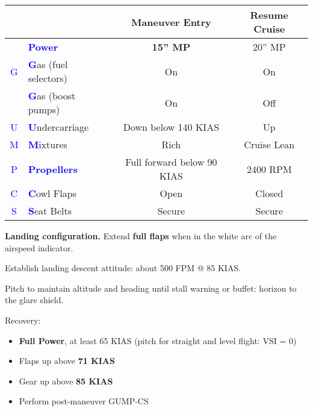 {\begin{table}[H]
\centering
\begin{tabular}{|c|l|c|c|}
\hline
                    &                                                 & \textbf{Maneuver Entry} & \textbf{Resume Cruise} \\ \hline
                    & \textcolor{blue}{\textbf{Power}}                & \textbf{15'' MP}        & 20'' MP                \\ \hline
\textcolor{blue}{G} & \textcolor{blue}{\textbf{G}}as (fuel selectors) & On                      & On                     \\
                    & \textcolor{blue}{\textbf{G}}as (boost pumps)    & On                      & Off                    \\ \hline
\textcolor{blue}{U} & \textcolor{blue}{\textbf{U}}ndercarriage        & Down below 140 KIAS     & Up                     \\ \hline
\textcolor{blue}{M} & \textcolor{blue}{\textbf{M}}ixtures             & Rich                    & Cruise Lean            \\ \hline
\textcolor{blue}{P} & \textcolor{blue}{\textbf{Propellers}}           & Full forward below 90 KIAS & 2400 RPM            \\ \hline
\textcolor{blue}{C} & \textcolor{blue}{\textbf{C}}owl Flaps           & Open                    & Closed                 \\ \hline
\textcolor{blue}{S} & \textcolor{blue}{\textbf{S}}eat Belts           & Secure                  & Secure                 \\ \hline
\end{tabular}
\end{table}

\textbf{Landing configuration.} Extend \textbf{full flaps} when in the white arc of the airspeed indicator.

Establish landing descent attitude: about 500 FPM @ 85 KIAS.

Pitch to maintain altitude and heading until stall warning or buffet: horizon to the glare shield.

Recovery:
\begin{itemize}[label={}]
\item \textbf{Full Power}, at least 65 KIAS (pitch for straight and level flight: VSI = 0)
\item Flaps up above \textbf{71 KIAS}
\item Gear up above \textbf{85 KIAS}
\item Perform post-maneuver GUMP-CS
\end{itemize}

}
